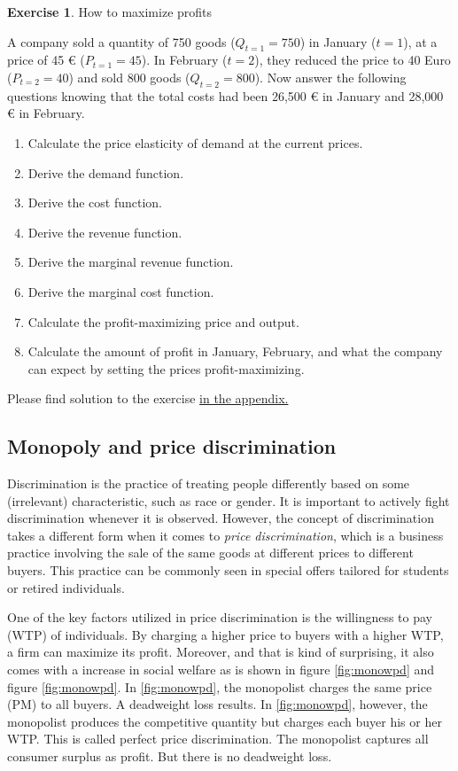 \documentclass[
  12pt,
  oneside]{book}
\providecommand{\tightlist}{%
  \setlength{\itemsep}{0pt}\setlength{\parskip}{0pt}}
\theoremstyle{definition}
\theoremstyle{definition}
\theoremstyle{definition}
\newtheorem{exercise}{Exercise}[chapter]
\theoremstyle{definition}
\theoremstyle{remark}
\begin{document}
\begin{exercise}
\protect\hypertarget{exr:howtomaxprofit}{}\label{exr:howtomaxprofit}How to maximize profits

A company sold a quantity of 750 goods (\(Q_{t=1}=750\)) in January (\(t=1\)), at a price of 45 € (\(P_{t=1}=45\)). In February (\(t=2\)), they reduced the price to 40 Euro (\(P_{t=2}=40\)) and sold 800 goods (\(Q_{t=2}=800\)). Now answer the following questions knowing that the total costs had been 26,500 € in January and 28,000 € in February.

\begin{enumerate}
\def\labelenumi{\arabic{enumi}.}
\tightlist
\item
  Calculate the price elasticity of demand at the current prices.
\item
  Derive the demand function.
\item
  Derive the cost function.
\item
  Derive the revenue function.
\item
  Derive the marginal revenue function.
\item
  Derive the marginal cost function.
\item
  Calculate the profit-maximizing price and output.
\item
  Calculate the amount of profit in January, February, and what the company can expect by setting the prices profit-maximizing.
\end{enumerate}

Please find solution to the exercise \hyperref[sol:howtomaxprofit]{in the appendix.}
\end{exercise}

\subsection{Monopoly and price discrimination}\label{monopoly-and-price-discrimination}

Discrimination is the practice of treating people differently based on some (irrelevant) characteristic, such as race or gender. It is important to actively fight discrimination whenever it is observed. However, the concept of discrimination takes a different form when it comes to \emph{price discrimination}, which is a business practice involving the sale of the same goods at different prices to different buyers. This practice can be commonly seen in special offers tailored for students or retired individuals.

One of the key factors utilized in price discrimination is the willingness to pay (WTP) of individuals. By charging a higher price to buyers with a higher WTP, a firm can maximize its profit. Moreover, and that is kind of surprising, it also comes with a increase in social welfare as is shown in figure \ref{fig:monowpd} and figure \ref{fig:monowpd}. In \ref{fig:monowpd}, the monopolist charges the same price (PM) to all buyers. A deadweight loss results. In \ref{fig:monowpd}, however, the monopolist produces the competitive quantity but charges each buyer his or her WTP. This is called perfect price discrimination. The monopolist captures all consumer surplus as profit. But there is no deadweight loss.
\end{document}
